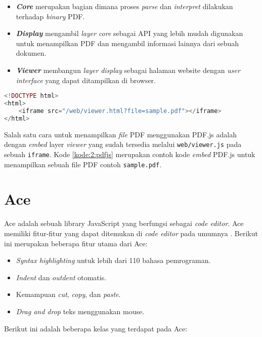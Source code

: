 \begin{itemize}
	\item \textit{\textbf{Core}} merupakan bagian dimana proses \textit{parse} dan \textit{interpret} dilakukan terhadap \textit{binary} PDF.
	\item \textit{\textbf{Display}} mengambil \textit{layer} \textit{core} sebagai API yang lebih mudah digunakan untuk menampilkan PDF dan mengambil informasi lainnya dari sebuah dokumen.
	\item \textit{\textbf{Viewer}} membangun \textit{layer} \textit{display} sebagai halaman website dengan \textit{user interface} yang dapat ditampilkan di browser.
\end{itemize}

\begin{lstlisting}[language=php, caption=Contoh kode untuk menggunakan PDF.js, label=kode:2:pdfjs]
<!DOCTYPE html>
<html>
    <iframe src="/web/viewer.html?file=sample.pdf"></iframe>
</html>
\end{lstlisting}

Salah satu cara untuk menampilkan \textit{file} PDF menggunakan PDF.js adalah dengan \textit{embed} layer \textit{viewer} yang sudah tersedia melalui \verb|web/viewer.js| pada sebuah \verb|iframe|. Kode \ref{kode:2:pdfjs} merupakan contoh kode \textit{embed} PDF.js untuk menampilkan sebuah file PDF contoh \verb|sample.pdf|.

\section{Ace}
\label{sec:2:ace} 
Ace adalah sebuah library JavaScript yang berfungsi sebagai \textit{code editor}.
Ace memiliki fitur-fitur yang dapat ditemukan di \textit{code editor} pada umumnya \cite{ace}. Berikut ini merupakan beberapa fitur utama dari Ace: 

\begin{itemize}
    \item \textit{Syntax highlighting} untuk lebih dari 110 bahasa pemrograman.
    \item \textit{Indent} dan \textit{outdent} otomatis.
    \item Kemampuan \textit{cut}, \textit{copy}, dan \textit{paste}.
    \item \textit{Drag and drop} teks menggunakan mouse.
\end{itemize}

Berikut ini adalah beberapa kelas yang terdapat pada Ace:

